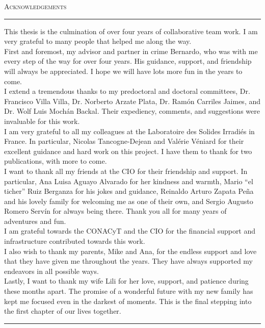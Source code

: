 \null
\vfill

\begin{center}

{\LARGE{\scshape Acknowledgements}}\\

\noindent\rule[2pt]{0.85\textwidth}{0.5pt}

\parbox{0.85\textwidth}{
This thesis is the culmination of over four years of collaborative team work. I
am very grateful to many people that helped me along the way.\\

First and foremost, my advisor and partner in crime Bernardo, who was with me
every step of the way for over four years. His guidance, support, and friendship
will always be appreciated. I hope we will have lots more fun in the years to
come.\\

I extend a tremendous thanks to my predoctoral and doctoral committees, Dr.
Francisco Villa Villa, Dr. Norberto Arzate Plata, Dr. Ramón Carriles Jaimes, and
Dr. Wolf Luis Moch\'an Backal. Their expediency, comments, and suggestions were
invaluable for this work.\\

I am very grateful to all my colleagues at the Laboratoire des Solides
Irradi\'es in France. In particular, Nicolas Tancogne-Dejean and Val\'erie
V\'eniard for their excellent guidance and hard work on this project. I have
them to thank for two publications, with more to come.\\

I want to thank all my friends at the CIO for their friendship and support. In
particular, Ana Luisa Aguayo Alvarado for her kindness and warmth, Mario ``el
ticher'' Ruiz Berganza for his jokes and guidance, Reinaldo Arturo Zapata Pe\~na
and his lovely family for welcoming me as one of their own, and Sergio Augusto
Romero Serv\'in for always being there. Thank you all for many years of
adventures and fun.\\

I am grateful towards the CONACyT and the CIO for the financial support and
infrastructure contributed towards this work.\\

I also wish to thank my parents, Mike and Ana, for the endless support and love
that they have given me throughout the years. They have always supported my
endeavors in all possible ways.\\

Lastly, I want to thank my wife Lili for her love, support, and patience during
these months apart. The promise of a wonderful future with my new family has
kept me focused even in the darkest of moments. This is the final stepping into
the first chapter of our lives together.}

\noindent\rule[2pt]{0.85\textwidth}{0.5pt}

\end{center}

\vfill

\cleardoublepage
